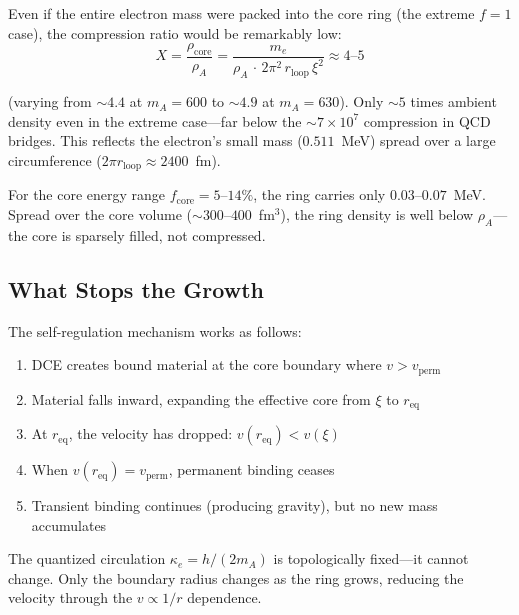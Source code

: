 \documentclass[12pt,letterpaper]{article}
\newcommand{\rhoa}{\rho_{\!A}}
\newcommand{\rloop}{r_{\mathrm{loop}}}
\begin{document}
Even if the entire electron mass were packed into the core ring (the extreme
$f = 1$ case), the compression ratio would be remarkably low:
%
\begin{equation}
  X = \frac{\rho_{\mathrm{core}}}{\rhoa}
    = \frac{m_e}{\rhoa\,\cdot\,2\pi^2\,\rloop\,\xi^2}
    \approx 4\text{--}5
  \label{eq:compression}
\end{equation}

(varying from $\sim\!4.4$ at $m_A = 600$ to $\sim\!4.9$ at $m_A = 630$).
Only $\sim\!5$ times ambient density even in the extreme case---far below
the $\sim\!7 \times 10^7$ compression in QCD bridges.  This reflects the
electron's small mass ($0.511$~MeV) spread over a large circumference
($2\pi\rloop \approx 2400$~fm).

For the core energy range $f_{\mathrm{core}} = 5$--$14\%$, the ring carries
only $0.03$--$0.07$~MeV.  Spread over the core volume
($\sim\!300$--$400$~fm$^3$), the ring density is well below
$\rhoa$---the core is sparsely filled, not compressed.

\subsection{What Stops the Growth}

The self-regulation mechanism works as follows:

\begin{enumerate}[leftmargin=2em]
  \item DCE creates bound material at the core boundary where $v > v_{\mathrm{perm}}$
  \item Material falls inward, expanding the effective core from $\xi$ to $r_{\mathrm{eq}}$
  \item At $r_{\mathrm{eq}}$, the velocity has dropped: $v(r_{\mathrm{eq}}) < v(\xi)$
  \item When $v(r_{\mathrm{eq}}) = v_{\mathrm{perm}}$, permanent binding ceases
  \item Transient binding continues (producing gravity), but no new mass accumulates
\end{enumerate}

The quantized circulation $\kappa_e = h/(2m_A)$ is topologically fixed---it
cannot change.  Only the boundary radius changes as the ring grows, reducing
the velocity through the $v \propto 1/r$ dependence.


\end{document}
